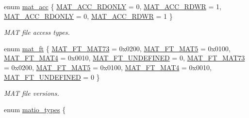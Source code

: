 \begin{DoxyCompactItemize}
enum \hyperlink{group___m_a_t_gaa9dcbc70f538af79bd557593ff6b5cdb}{mat\+\_\+acc} \{ \hyperlink{group___m_a_t_ggaa9dcbc70f538af79bd557593ff6b5cdba8dd1457651b27ba9bea6cfba158c037c}{M\+A\+T\+\_\+\+A\+C\+C\+\_\+\+R\+D\+O\+N\+LY} = 0, 
\hyperlink{group___m_a_t_ggaa9dcbc70f538af79bd557593ff6b5cdba0f65f27ea42fde32d62b702b82329c1f}{M\+A\+T\+\_\+\+A\+C\+C\+\_\+\+R\+D\+WR} = 1, 
\hyperlink{group___m_a_t_ggaa9dcbc70f538af79bd557593ff6b5cdba8dd1457651b27ba9bea6cfba158c037c}{M\+A\+T\+\_\+\+A\+C\+C\+\_\+\+R\+D\+O\+N\+LY} = 0, 
\hyperlink{group___m_a_t_ggaa9dcbc70f538af79bd557593ff6b5cdba0f65f27ea42fde32d62b702b82329c1f}{M\+A\+T\+\_\+\+A\+C\+C\+\_\+\+R\+D\+WR} = 1
 \}\begin{DoxyCompactList}\small\item\em M\+AT file access types. \end{DoxyCompactList}
\item 
enum \hyperlink{group___m_a_t_gad03442b8378999189d510e3745c702b7}{mat\+\_\+ft} \{ \newline
\hyperlink{group___m_a_t_ggad03442b8378999189d510e3745c702b7a765c5d1d5038947646260dc82483517e}{M\+A\+T\+\_\+\+F\+T\+\_\+\+M\+A\+T73} = 0x0200, 
\hyperlink{group___m_a_t_ggad03442b8378999189d510e3745c702b7a31ade1f6989411dc0299007e2c7d33b2}{M\+A\+T\+\_\+\+F\+T\+\_\+\+M\+A\+T5} = 0x0100, 
\hyperlink{group___m_a_t_ggad03442b8378999189d510e3745c702b7a858b4f5da65548219b1c3ad47aa478d3}{M\+A\+T\+\_\+\+F\+T\+\_\+\+M\+A\+T4} = 0x0010, 
\hyperlink{group___m_a_t_ggad03442b8378999189d510e3745c702b7a29ebbcb4c6854eb5524a94d0f153a547}{M\+A\+T\+\_\+\+F\+T\+\_\+\+U\+N\+D\+E\+F\+I\+N\+ED} = 0, 
\newline
\hyperlink{group___m_a_t_ggad03442b8378999189d510e3745c702b7a765c5d1d5038947646260dc82483517e}{M\+A\+T\+\_\+\+F\+T\+\_\+\+M\+A\+T73} = 0x0200, 
\hyperlink{group___m_a_t_ggad03442b8378999189d510e3745c702b7a31ade1f6989411dc0299007e2c7d33b2}{M\+A\+T\+\_\+\+F\+T\+\_\+\+M\+A\+T5} = 0x0100, 
\hyperlink{group___m_a_t_ggad03442b8378999189d510e3745c702b7a858b4f5da65548219b1c3ad47aa478d3}{M\+A\+T\+\_\+\+F\+T\+\_\+\+M\+A\+T4} = 0x0010, 
\hyperlink{group___m_a_t_ggad03442b8378999189d510e3745c702b7a29ebbcb4c6854eb5524a94d0f153a547}{M\+A\+T\+\_\+\+F\+T\+\_\+\+U\+N\+D\+E\+F\+I\+N\+ED} = 0
 \}\begin{DoxyCompactList}\small\item\em M\+AT file versions. \end{DoxyCompactList}
\item 
enum \hyperlink{group___m_a_t_gacf7b3b879282b7ab3a51190e49bf3453}{matio\+\_\+types} \{ \newline

\end{DoxyCompactItemize}
